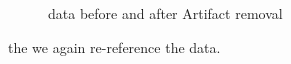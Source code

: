 \documentclass[11pt]{article}
\begin{document}
\begin{figure}[H]
    \begin{minipage}{.55\textwidth}
    \end{minipage}
    \hfill    
    \begin{minipage}{.55\textwidth}
    \end{minipage}
        \caption{data before and after Artifact removal}\label{fig:clocs3d}
\end{figure}

the we again re-reference the data. \\
\end{document}
